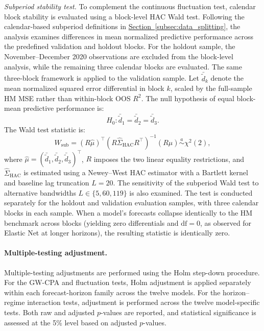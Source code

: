 \documentclass[runningheads,orivec]{llncs}
\begin{document}
\textit{Subperiod stability test.} To complement the continuous fluctuation test, calendar block stability is evaluated using a block-level HAC Wald test. Following the calendar-based subperiod definitions in \hyperref[subsec:data_splitting]{Section~\ref*{subsec:data_splitting}}, the analysis examines differences in mean normalized predictive performance across the predefined validation and holdout blocks. For the holdout sample, the November--December 2020 observations are excluded from the block-level analysis, while the remaining three calendar blocks are evaluated. The same three-block framework is applied to the validation sample. Let $\bar{\widetilde d}_k$ denote the mean normalized squared error differential in block $k$, scaled by the full-sample HM MSE rather than within-block OOS $R^2$. The null hypothesis of equal block-mean predictive performance is:
\begin{equation}
H_0:
\bar{\widetilde d}_1
=
\bar{\widetilde d}_2
=
\bar{\widetilde d}_3.
\end{equation}
The Wald test statistic is:
\begin{equation}
W_{\mathrm{sub}}
=
(R\widehat\mu)^\top
(R\widehat\Sigma_{\mathrm{HAC}}R^\top)^{-1}
(R\widehat\mu)
\overset{a}{\sim}\chi^2(2),
\end{equation}
where $\widehat\mu=(\bar{\widetilde d}_1,\bar{\widetilde d}_2,\bar{\widetilde d}_3)^\top$, $R$ imposes the two linear equality restrictions, and $\widehat\Sigma_{\mathrm{HAC}}$ is estimated using a Newey--West HAC estimator with a Bartlett kernel and baseline lag truncation $L=20$. The sensitivity of the subperiod Wald test to alternative bandwidths $L\in\{5,60,119\}$ is also examined. The test is conducted separately for the holdout and validation evaluation samples, with three calendar blocks in each sample. When a model's forecasts collapse identically to the HM benchmark across blocks (yielding zero differentials and $\mathrm{df}=0$, as observed for Elastic Net at longer horizons), the resulting statistic is identically zero.

\paragraph{Multiple-testing adjustment.} Multiple-testing adjustments are performed using the Holm step-down procedure. For the GW-CPA and fluctuation tests, Holm adjustment is applied separately within each forecast-horizon family across the twelve models. For the horizon--regime interaction tests, adjustment is performed across the twelve model-specific tests. Both raw and adjusted $p$-values are reported, and statistical significance is assessed at the 5\% level based on adjusted $p$-values.
\end{document}
